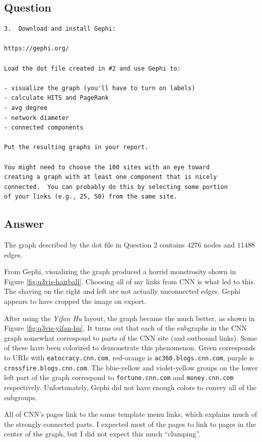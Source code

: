\documentclass[letterpaper,11pt]{article}
\begin{document}
\subsection*{Question}

\begin{verbatim}
3.  Download and install Gephi:

https://gephi.org/

Load the dot file created in #2 and use Gephi to:

- visualize the graph (you'll have to turn on labels)
- calculate HITS and PageRank
- avg degree
- network diameter
- connected components

Put the resulting graphs in your report.

You might need to choose the 100 sites with an eye toward
creating a graph with at least one component that is nicely
connected.  You can probably do this by selecting some portion
of your links (e.g., 25, 50) from the same site.  
\end{verbatim}

\newpage
\subsection*{Answer}

The graph described by the dot file in Question 2 contains $4276$ nodes and $11488$ edges.

From Gephi, visualizing the graph produced a horrid monstrosity shown in Figure \ref{fig:q3vis-hairball}.  Choosing all of my links from CNN is what led to this.  The shaving on the right and left are not actually unconnected edges.  Gephi appears to have cropped the image on export.

After using the \emph{Yifan Hu} layout, the graph became the much better, as shown in Figure \ref{fig:q3vis-yifan-hu}.  It turns out that each of the subgraphs in the CNN graph somewhat correspond to parts of the CNN site (and outbound links).  Some of these have been colorized to demonstrate this phenomenon.  Green corresponds to URIs with \verb+eatocracy.cnn.com+, red-orange is \verb+ac360.blogs.cnn.com+, purple is \verb+crossfire.blogs.cnn.com+.  The blue-yellow and violet-yellow groups on the lower left part of the graph correspond to \verb+fortune.cnn.com+ and \verb+money.cnn.com+ respectively.  Unfortunately, Gephi did not have enough colors to convey all of the subgroups.

All of CNN's pages link to the same template menu links, which explains much of the strongly connected parts.  I expected most of the pages to link to pages in the center of the graph, but I did not expect this much ``clumping''.
\end{document}
